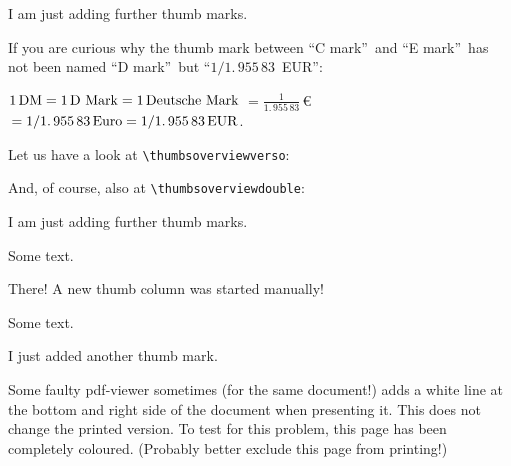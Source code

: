 \documentclass[twoside,british]{article}[2007/10/19]%
\gdef\unit#1{\mathord{\thinspace\mathrm{#1}}}
\begin{document}
I am just adding further thumb marks.

If you are curious why the thumb mark between
\textquotedblleft C mark\textquotedblright\ and \textquotedblleft E mark\textquotedblright\ has
not been named \textquotedblleft D mark\textquotedblright\ but
\textquotedblleft $1/1.\,955\,83$\, EUR\textquotedblright :

$1\unit{DM}=1\unit{D\ Mark}=1\unit{Deutsche\ Mark}$\newline
$=\frac{1}{1.\,955\,83}\,$\euro $\,=1/1.\,955\,83\unit{Euro}=1/1.\,955\,83\unit{EUR}$.

\newpage

Let us have a look at \verb|\thumbsoverviewverso|:

%

\newpage

And, of course, also at \verb|\thumbsoverviewdouble|:

%

\newpage


I am just adding further thumb marks.

\newpage


Some text.

\newpage
\thumbnewcolumn
{}

There! A new thumb column was started manually!

\newpage

Some text.

\newpage


I just added another thumb mark.

\newpage

\pagecolor{green}

\makeatletter
{}%
\makeatother

\label{greenpage}

Some faulty pdf-viewer sometimes (for the same document!)
adds a white line at the bottom and right side of the document
when presenting it. This does not change the printed version.
To test for this problem, this page has been completely coloured.
(Probably better exclude this page from printing!)
\end{document}
